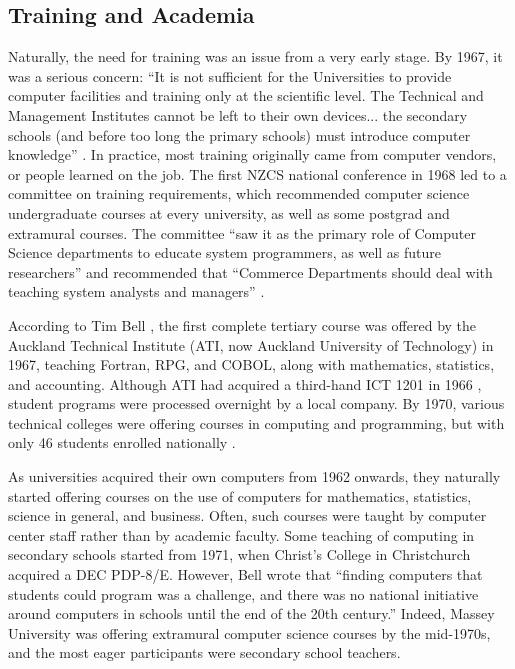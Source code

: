 \documentclass{IEEEcsmag}
\begin{document}
\subsection{Training and Academia}
\vspace*{5pt}
Naturally, the need for training was an issue from a very early stage. By 1967, it was a serious concern: “It is not sufficient for the Universities to provide computer facilities and training only at the scientific level. The Technical and Management Institutes cannot be left to their own devices... the secondary schools (and before too long the primary schools) must introduce computer knowledge” \cite{ScottSurvey1967}. In practice, most training originally came from computer vendors, or people learned on the job. The first NZCS national conference in 1968 led to a committee on training requirements, which recommended computer science undergraduate courses at every university, as well as some postgrad and extramural courses. The committee “saw it as the primary role of Computer Science departments to educate system programmers, as well as future researchers” and recommended that “Commerce Departments should deal with teaching system analysts and managers” \cite{Otago-history}.

According to Tim Bell \cite{Bell}, the first complete tertiary course was offered by the Auckland Technical Institute (ATI, now Auckland University of Technology) in 1967, teaching Fortran, RPG, and COBOL, along with mathematics, statistics, and accounting. Although ATI had acquired a third-hand ICT 1201 in 1966 \cite{FirstCinNZ}, student programs were processed overnight by a local company. By 1970, various technical colleges were offering courses in computing and programming, but with only 46 students enrolled nationally \cite{Yearbook73}.

As universities acquired their own computers from 1962 onwards, they naturally started offering courses on the use of computers for mathematics, statistics, science in general, and business. Often, such courses were taught by computer center staff rather than by academic faculty. Some teaching of computing in secondary schools started from 1971, when Christ's College in Christchurch acquired a DEC PDP-8/E. However, Bell \cite{Bell} wrote that “finding computers that students could program was a challenge, and there was no national initiative around computers in schools until the end of the 20th century.” Indeed, Massey University was offering extramural computer science courses by the mid-1970s, and the most eager participants were secondary school teachers.
\end{document}
